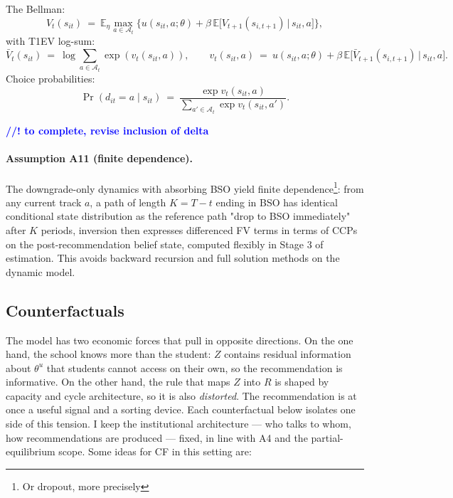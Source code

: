 \documentclass{article}
\begin{document}
The Bellman:
\begin{equation}
  V_t(s_{it}) \ =\ \mathbb{E}_\eta \max_{a \in \mathcal{A}_t} \Big\{ u(s_{it}, a; \theta) + \beta\, \mathbb{E}\big[V_{t+1}(s_{i,t+1}) \,\big|\, s_{it}, a\big] \Big\},
  \label{eq:bellman}
\end{equation}
with T1EV log-sum:
\begin{equation}
  \bar V_t(s_{it}) \ =\ \log \sum_{a \in \mathcal{A}_t} \exp(v_t(s_{it}, a)), \qquad v_t(s_{it}, a) \ =\ u(s_{it}, a; \theta) + \beta\, \mathbb{E}\big[\bar V_{t+1}(s_{i,t+1}) \,\big|\, s_{it}, a\big].
  \label{eq:logsum}
\end{equation}
Choice probabilities:
\begin{equation}
  \Pr(d_{it} = a \mid s_{it}) \ =\ \frac{\exp v_t(s_{it}, a)}{\sum_{a' \in \mathcal{A}_t} \exp v_t(s_{it}, a')}.
  \label{eq:ccp}
\end{equation}

\textcolor{blue}{\textbf{//! to complete, revise inclusion of delta}}

\paragraph{Assumption A11 (finite dependence).} The downgrade-only dynamics with absorbing BSO yield finite dependence\footnote{Or dropout, more precisely}: from any current track $a$, a path of length $K = T - t$ ending in BSO has identical conditional state distribution as the reference path "drop to BSO immediately" after $K$ periods, \citet{arcidiacono_miller_2011, arcidiacono2025college} inversion then expresses differenced FV terms in terms of CCPs on the post-recommendation belief state, computed flexibly in Stage 3 of estimation. This avoids backward recursion and full solution methods on the dynamic model. 


\subsection{Counterfactuals}
\label{sec:cf}

The model has two economic forces that pull in opposite directions. On the one hand, the school knows more than the student: $Z$ contains residual information about $\theta^u$ that students cannot access on their own, so the recommendation is informative. On the other hand, the rule that maps $Z$ into $R$ is shaped by capacity and cycle architecture, so it is also \emph{distorted}. The recommendation is at once a useful signal and a sorting device. Each counterfactual below isolates one side of this tension. I keep the institutional architecture --- who talks to whom, how recommendations are produced --- fixed, in line with A4 and the partial-equilibrium scope. Some ideas for CF in this setting are: 
\end{document}
